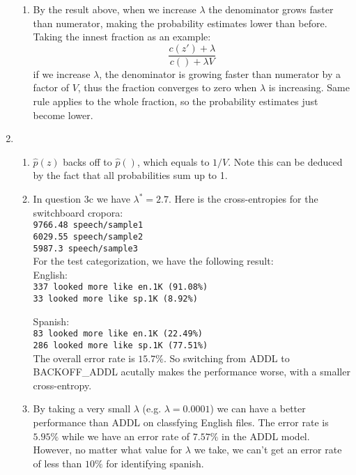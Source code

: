 \documentclass[10pt]{article}
\begin{document}
\begin{enumerate}
\begin{enumerate}
            \item
            By the result above, when we increase $\lambda$ the denominator grows faster than numerator, making the probability estimates lower than before. Taking the innest fraction as an example:
            $$\frac{c(z') + \lambda}{c() + \lambda V}$$
            if we increase $\lambda$, the denominator is growing faster than numerator by a factor of $V$, thus the fraction converges to zero when $\lambda$ is increasing. Same rule applies to the whole fraction, so the probability estimates just become lower.
        \end{enumerate}
    \item 
        \begin{enumerate} %
            \item
            $\hat{p}(z)$ backs off to $\hat{p}()$, which equals to $1/V$. Note this can be deduced by the fact that all probabilities sum up to 1.
            \item
                In question 3c we have $\lambda^* = 2.7$. 
                Here is the cross-entropies for the switchboard cropora:\\
                \texttt{9766.48 speech/sample1\\
                6029.55 speech/sample2\\
                5987.3      speech/sample3}\\
                
                For the test categorization, we have the following result:\\
                English:\\
                \texttt{337 looked more like en.1K (91.08\%)\\
                33 looked more like sp.1K (8.92\%)}
                
                Spanish:\\
                \texttt{83 looked more like en.1K (22.49\%)\\
                286 looked more like sp.1K (77.51\%)}\\
                The overall error rate is $15.7\%$. So switching from ADDL to BACKOFF\_ADDL acutally makes the performance worse, with a smaller cross-entropy.
                
            \item
            By taking a very small $\lambda$ (e.g. $\lambda = 0.0001$) we can have a better performance than ADDL on classfying English files. The error rate is $5.95\%$ while we have an error rate of $7.57\%$ in the ADDL model. However, no matter what value for $\lambda$ we take, we can't get an error rate of less than $10\%$ for identifying spanish. 
            

\end{enumerate}
\end{enumerate}
\end{document}
